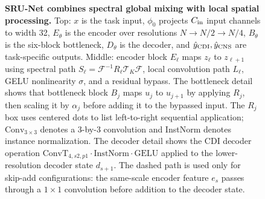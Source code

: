 \documentclass[11pt]{article}
\newcommand{\ConvTT}{\mathrm{Conv}_{3\times 3}}
\begin{document}
\begin{figure}[!htbp]
{%
}
\caption{\textbf{SRU-Net combines spectral global mixing with local spatial
processing.} Top: $x$ is the task input, $\phi_0$ projects $C_{\rm in}$ input
channels to width 32, $E_\theta$ is the encoder over resolutions
$N\!\to\!N/2\!\to\!N/4$, $B_\theta$ is the
six-block bottleneck, $D_\theta$ is the decoder, and
$\hat y_{\rm CDI},\hat y_{\rm CNS}$ are task-specific outputs. Middle:
encoder block $E_\ell$ maps $z_\ell$ to $z_{\ell+1}$ using spectral path
$S_\ell=\mathcal F^{-1}R_\ell\mathcal T_K\mathcal F$, local convolution path
$L_\ell$, GELU nonlinearity $\sigma$, and a residual bypass. The bottleneck
detail shows that
bottleneck block $B_j$ maps $u_j$ to $u_{j+1}$ by applying $R_j$, then scaling
it by $\alpha_j$ before adding it to the bypassed input. The $R_j$ box uses
centered dots to list left-to-right sequential application; $\ConvTT$ denotes a
3-by-3 convolution and InstNorm denotes instance normalization. The decoder
detail shows the CDI decoder operation
$\mathrm{ConvT}_{4,s2,p1}\cdot\mathrm{InstNorm}\cdot\mathrm{GELU}$ applied to
the lower-resolution decoder state $d_{s+1}$. The dashed path is used only for
skip-add configurations: the same-scale encoder feature $e_s$ passes through a
$1\times1$ convolution before addition to the decoder state.}
\label{fig:srunet_architecture}
\end{figure}
\FloatBarrier
\end{document}
